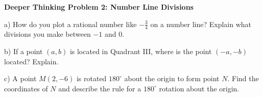 \documentclass[12pt, letterpaper, fleqn]{article}
\begin{document}
\begin{tcolorbox}[colback=white, colframe=black, boxrule=1pt, arc=4mm, left=6mm, right=6mm, top=5mm, bottom=5mm]
\textbf{Deeper Thinking Problem 2: Number Line Divisions}

\medskip

\noindent
a) How do you plot a rational number like $-\frac{3}{4}$ on a number line? Explain what divisions you make between $-1$ and 0.

\vspace{5.5cm}

\noindent
b) If a point $(a, b)$ is located in Quadrant III, where is the point $(-a, -b)$ located? Explain.

\vspace{5.5cm}

\noindent
c) A point $M(2, -6)$ is rotated $180^\circ$ about the origin to form point $N$. Find the coordinates of $N$ and describe the rule for a $180^\circ$ rotation about the origin.

\vspace{5cm}
\end{tcolorbox}
\newpage
\end{document}
